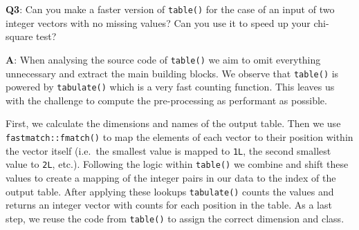 \documentclass[
]{krantz}
\makeatletter
\newenvironment{Shaded}{\begin{snugshade}}{\end{snugshade}}
\newcommand{\CommentTok}[1]{\textcolor[rgb]{0.56,0.35,0.01}{\textit{#1}}}
\newcommand{\DataTypeTok}[1]{\textcolor[rgb]{0.13,0.29,0.53}{#1}}
\newcommand{\DecValTok}[1]{\textcolor[rgb]{0.00,0.00,0.81}{#1}}
\newcommand{\KeywordTok}[1]{\textcolor[rgb]{0.13,0.29,0.53}{\textbf{#1}}}
\newcommand{\NormalTok}[1]{#1}
\newcommand{\OperatorTok}[1]{\textcolor[rgb]{0.81,0.36,0.00}{\textbf{#1}}}
\newcommand{\OtherTok}[1]{\textcolor[rgb]{0.56,0.35,0.01}{#1}}
\newcommand{\StringTok}[1]{\textcolor[rgb]{0.31,0.60,0.02}{#1}}
\newenvironment{kframe}{%
\medskip{}
\setlength{\fboxsep}{.8em}
 \def\at@end@of@kframe{}%
 \ifinner\ifhmode%
  \def\at@end@of@kframe{\end{minipage}}%
  \begin{minipage}{\columnwidth}%
 \fi\fi%
 \def\FrameCommand##1{\hskip\@totalleftmargin \hskip-\fboxsep
 \colorbox{shadecolor}{##1}\hskip-\fboxsep
     \hskip-\linewidth \hskip-\@totalleftmargin \hskip\columnwidth}%
 \MakeFramed {\advance\hsize-\width
   \@totalleftmargin\z@ \linewidth\hsize
   \@setminipage}}%
 {\par\unskip\endMakeFramed%
 \at@end@of@kframe}
\renewenvironment{Shaded}{\begin{kframe}}{\end{kframe}}
\renewcommand{\KeywordTok} [1]{\textcolor[rgb]{0.00,0.44,0.13}{{#1}}}
\renewcommand{\DataTypeTok}[1]{\textcolor[rgb]{0.56,0.13,0.00}{{#1}}}
\renewcommand{\DecValTok}  [1]{\textcolor[rgb]{0.25,0.63,0.44}{{#1}}}
\renewcommand{\StringTok}  [1]{\textcolor[rgb]{0.25,0.44,0.63}{{#1}}}
\renewcommand{\CommentTok} [1]{\textcolor[rgb]{0.38,0.63,0.69}{{#1}}}
\renewcommand{\OtherTok}   [1]{\textcolor[rgb]{0.00,0.44,0.13}{{#1}}}
\renewcommand{\NormalTok}  [1]{{#1}}
\makeatother
\begin{document}
\begin{Shaded}
\end{Shaded}

\textbf{{Q3}}: Can you make a faster version of \texttt{table()} for the case of an input of two integer vectors with no missing values? Can you use it to speed up your chi-square test?

\textbf{{A}}: When analysing the source code of \texttt{table()} we aim to omit everything unnecessary and extract the main building blocks. We observe that \texttt{table()} is powered by \texttt{tabulate()} which is a very fast counting function. This leaves us with the challenge to compute the pre-processing as performant as possible.

First, we calculate the dimensions and names of the output table. Then we use \texttt{fastmatch::fmatch()} to map the elements of each vector to their position within the vector itself (i.e.~the smallest value is mapped to \texttt{1L}, the second smallest value to \texttt{2L}, etc.). Following the logic within \texttt{table()} we combine and shift these values to create a mapping of the integer pairs in our data to the index of the output table. After applying these lookups \texttt{tabulate()} counts the values and returns an integer vector with counts for each position in the table. As a last step, we reuse the code from \texttt{table()} to assign the correct dimension and class.
\end{document}
